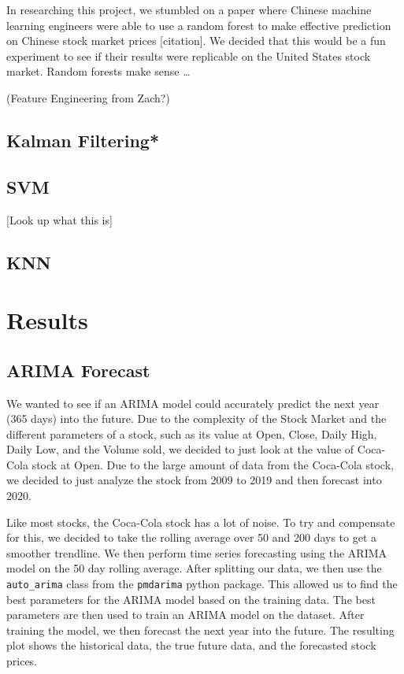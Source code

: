 \documentclass[11pt]{article}
\begin{document}
In researching this project, we stumbled on a paper where Chinese machine learning engineers were able to use a random 
forest to make effective prediction on Chinese stock market prices [citation]. We decided that this would be a fun experiment 
to see if their results were replicable on the United States stock market. Random forests make sense \dots

(Feature Engineering from Zach?)

\subsection{Kalman Filtering*}



\subsection{SVM} [Look up what this is]



\subsection{KNN}



\section{Results}

\subsection{ARIMA Forecast}

We wanted to see if an ARIMA model could accurately predict the next year (365 days) into the future. 
Due to the complexity of the Stock Market and the different parameters of a stock, such as its value 
at Open, Close, Daily High, Daily Low, and the Volume sold, we decided to just look at the value of 
Coca-Cola stock at Open. Due to the large amount of data from the Coca-Cola stock, we decided to just 
analyze the stock from 2009 to 2019 and then forecast into 2020.\par

Like most stocks, the Coca-Cola stock has a lot of noise. To try and compensate for this, we decided 
to take the rolling average over 50 and 200 days to get a smoother trendline. We then perform time series 
forecasting using the ARIMA model on the 50 day rolling average. After splitting our data, we then use the 
\texttt{auto\_arima} class from the \texttt{pmdarima} python package. This allowed us to find the best parameters 
for the ARIMA model based on the training data. The best parameters are then used to train an ARIMA model on the 
dataset. After training the model, we then forecast the next year into the future. The resulting plot shows the historical 
data, the true future data, and the forecasted stock prices.\par
\end{document}
